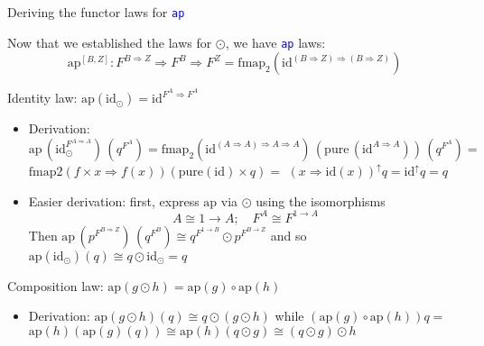\documentclass[english]{beamer}
\begin{document}
\begin{frame}{Deriving the functor laws for \texttt{\textcolor{blue}{\footnotesize{}ap}} }

\vspace{-0.10cm}Now that we established the laws for $\odot$, we
have \texttt{\textcolor{blue}{\footnotesize{}ap}} laws:
\[
\text{ap}^{[B,Z]}:F^{B\Rightarrow Z}\Rightarrow F^{B}\Rightarrow F^{Z}=\text{fmap}_{2}\left(\text{id}^{\left(B\Rightarrow Z\right)\Rightarrow\left(B\Rightarrow Z\right)}\right)
\]

Identity law: $\text{ap}\left(\text{id}_{\odot}\right)=\text{id}^{F^{A}\Rightarrow F^{A}}$
\begin{itemize}
\item Derivation:{\footnotesize{} $\text{ap}\,(\text{id}_{\odot}^{F^{A\Rightarrow A}})\,(q^{F^{A}})=\text{fmap}_{2}(\text{id}^{\left(A\Rightarrow A\right)\Rightarrow A\Rightarrow A})\,(\text{pure}\,(\text{id}^{A\Rightarrow A}))\,(q^{F^{A}})=$}
{\footnotesize{}$\text{fmap2}\left(f\times x\Rightarrow f(x)\right)\left(\text{pure}\left(\text{id}\right)\times q\right)=$
$\left(x\Rightarrow\text{id}(x)\right)^{\uparrow}q=\text{id}^{\uparrow}q=q$} 
\item Easier derivation: first, express {\footnotesize{}$\text{ap}$} via
$\odot$ using the isomorphisms{\footnotesize{}
\[
A\cong1\rightarrow A;\quad F^{A}\cong F^{1\rightarrow A}
\]
}Then {\footnotesize{}$\text{ap}\,(p^{F^{B\Rightarrow Z}})\,(q^{F^{B}})\cong q^{F^{1\rightarrow B}}\odot p^{F^{B\rightarrow Z}}$}
and so {\footnotesize{}$\text{ap}\left(\text{id}_{\odot}\right)\left(q\right)\cong q\odot\text{id}_{\odot}=q$}{\footnotesize \par}
\end{itemize}
Composition law: $\text{ap}\left(g\odot h\right)=\text{ap}\left(g\right)\circ\text{ap}\left(h\right)$
\begin{itemize}
\item Derivation: {\footnotesize{}$\text{ap}\left(g\odot h\right)\left(q\right)\cong q\odot\left(g\odot h\right)$}
while {\footnotesize{}$\left(\text{ap}\left(g\right)\circ\text{ap}\left(h\right)\right)q=$
$\text{ap}\left(h\right)\left(\text{ap}\left(g\right)\left(q\right)\right)\cong\text{ap}\left(h\right)\left(q\odot g\right)\cong\left(q\odot g\right)\odot h$}{\footnotesize \par}
\end{itemize}
\end{frame}
\end{document}
